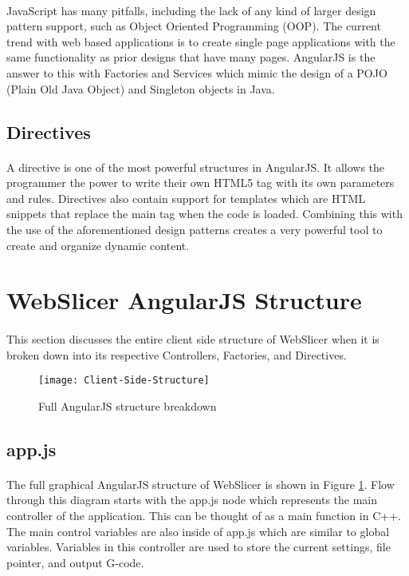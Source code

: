 \paragraph{}
JavaScript has many pitfalls, including the lack of any kind of larger design pattern support, such as Object Oriented Programming (OOP).
The current trend with web based applications is to create single page applications with the same functionality as prior designs that have many pages.
AngularJS is the answer to this with Factories and Services which mimic the design of a POJO (Plain Old Java Object) and Singleton objects in Java.

\subsection{Directives}
\paragraph{}
A directive is one of the most powerful structures in AngularJS.
It allows the programmer the power to write their own HTML5 tag with its own parameters and rules.
Directives also contain support for templates which are HTML snippets that replace the main tag when the code is loaded.
Combining this with the use of the aforementioned design patterns creates a very powerful tool to create and organize dynamic content.

\section{WebSlicer AngularJS Structure}
\paragraph{}
This section discusses the entire client side structure of WebSlicer when it is broken down into its respective Controllers, Factories, and Directives.

\begin{figure}[!ht]
  \centering
  \texttt{[image: Client-Side-Structure]}
  \caption{Full AngularJS structure breakdown}
  \label{fig:client-side-structure}
\end{figure}

\subsection{app.js}%
\paragraph{}
The full graphical AngularJS structure of WebSlicer is shown in Figure \ref{fig:client-side-structure}.
Flow through this diagram starts with the app.js node which represents the main controller of the application.
This can be thought of as a main function in C++.
The main control variables are also inside of app.js which are similar to global variables.
Variables in this controller are used to store the current settings, file pointer, and output G-code.

